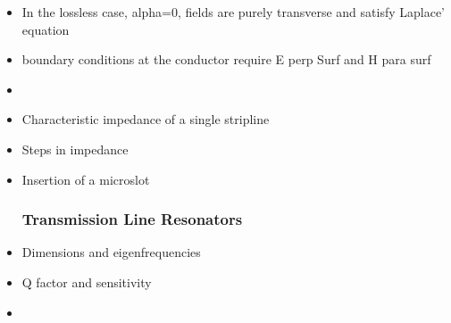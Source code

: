 \begin{itemize}
\item
  In the lossless case, alpha=0, fields are purely transverse and
  satisfy Laplace' equation
\item
  boundary conditions at the conductor require E perp Surf and H para
  surf
\item
\item
  Characteristic impedance of a single stripline
\item
  Steps in impedance
\item
  Insertion of a microslot

  \subsubsection{Transmission Line
  Resonators}\label{transmission-line-resonators}
\item
  Dimensions and eigenfrequencies
\item
  Q factor and sensitivity
\item
\end{itemize}
